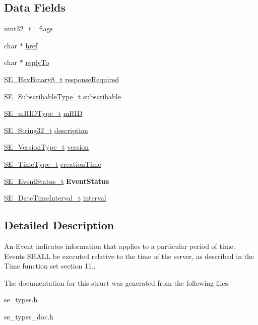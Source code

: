 \subsection*{Data Fields}
\begin{DoxyCompactItemize}
\item 
uint32\+\_\+t \hyperlink{group__Event_gac9829e2ed56cc6d533951c5829a06447}{\+\_\+flags}
\item 
char $\ast$ \hyperlink{group__Event_gab778833a8a3a8f65c71ed89d477ffd26}{href}
\item 
char $\ast$ \hyperlink{group__Event_ga6e7f7661e18f5488e25401be9e7ee189}{reply\+To}
\item 
\hyperlink{group__HexBinary8_gaecf2dab3615fb954a693c017a61f77d6}{S\+E\+\_\+\+Hex\+Binary8\+\_\+t} \hyperlink{group__Event_ga78cfb38c0c12b9e22a7bc22493dfc841}{response\+Required}
\item 
\hyperlink{group__SubscribableType_ga5c41f553d369710ed34619266bf2551e}{S\+E\+\_\+\+Subscribable\+Type\+\_\+t} \hyperlink{group__Event_ga39e93713a0f72e98d013681430dbea2b}{subscribable}
\item 
\hyperlink{group__mRIDType_gac74622112f3a388a2851b2289963ba5e}{S\+E\+\_\+m\+R\+I\+D\+Type\+\_\+t} \hyperlink{group__Event_ga6985465bb16ad66b47d319bbce654b5c}{m\+R\+ID}
\item 
\hyperlink{group__String32_gac9f59b06b168b4d2e0d45ed41699af42}{S\+E\+\_\+\+String32\+\_\+t} \hyperlink{group__Event_gae4f20895ab9cd471d8b83c6a44f936fe}{description}
\item 
\hyperlink{group__VersionType_ga4b8d27838226948397ed99f67d46e2ae}{S\+E\+\_\+\+Version\+Type\+\_\+t} \hyperlink{group__Event_ga2e534e84cddb42f9ac5e30cac9852117}{version}
\item 
\hyperlink{group__TimeType_ga6fba87a5b57829b4ff3f0e7638156682}{S\+E\+\_\+\+Time\+Type\+\_\+t} \hyperlink{group__Event_gaf230dbf11dcdc46c1f94be114028033f}{creation\+Time}
\item 
\hyperlink{structSE__EventStatus__t}{S\+E\+\_\+\+Event\+Status\+\_\+t} {\bfseries Event\+Status}
\item 
\hyperlink{structSE__DateTimeInterval__t}{S\+E\+\_\+\+Date\+Time\+Interval\+\_\+t} \hyperlink{group__Event_gaeaa7db57ff123c151dba417d4d60ec42}{interval}
\end{DoxyCompactItemize}


\subsection{Detailed Description}
An Event indicates information that applies to a particular period of time. Events S\+H\+A\+LL be executed relative to the time of the server, as described in the Time function set section 11.. 

The documentation for this struct was generated from the following files\+:\begin{DoxyCompactItemize}
\item 
se\+\_\+types.\+h\item 
se\+\_\+types\+\_\+doc.\+h\end{DoxyCompactItemize}
